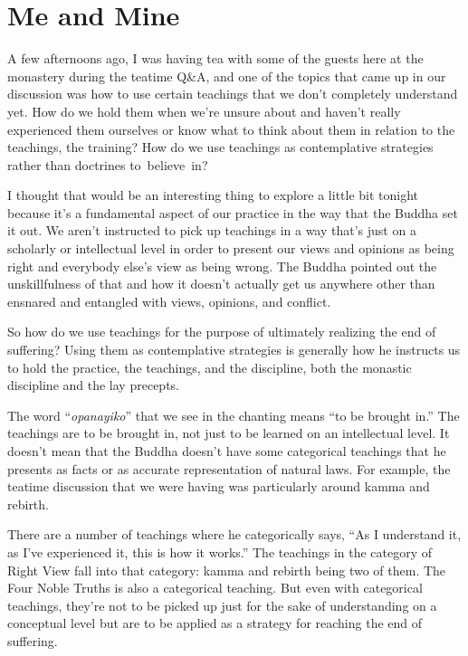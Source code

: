 
\chapter{Me and Mine}

A few afternoons ago, I was having tea with some of the guests here at the monastery during the teatime Q\&A, and one of the topics that came up in our discussion was how to use certain teachings that we don't completely understand yet. How do we hold them when we're unsure about and haven't really experienced them ourselves or know what to think about them in relation to the teachings, the training? How do we use teachings as contemplative strategies rather than doctrines \mbox{to believe in?}

I thought that would be an interesting thing to explore a little bit tonight because it's a fundamental aspect of our practice in the way that the Buddha set it out. We aren't instructed to pick up teachings in a way that's just on a scholarly or intellectual level in order to present our views and opinions as being right and everybody else's view as being wrong. The Buddha pointed out the unskillfulness of that and how it doesn't actually get us anywhere other than ensnared and entangled with views, opinions, and conflict.

So how do we use teachings for the purpose of ultimately realizing the end of suffering? Using them as contemplative strategies is generally how he instructs us to hold the practice, the teachings, and the discipline, both the monastic discipline and the lay precepts.

The word ``\emph{opanayiko}'' that we see in the chanting means ``to be brought in.'' The teachings are to be brought in, not just to be learned on an intellectual level. It doesn't mean that the Buddha doesn't have some categorical teachings that he presents as facts or as accurate representation of natural laws. For example, the teatime discussion that we were having was particularly around kamma and rebirth.

There are a number of teachings where he categorically says, ``As I understand it, as I've experienced it, this is how it works.'' The teachings in the category of Right View fall into that category: kamma and rebirth being two of them. The Four Noble Truths is also a categorical teaching. But even with categorical teachings, they're not to be picked up just for the sake of understanding on a conceptual level but are to be applied as a strategy for reaching the end of suffering.

